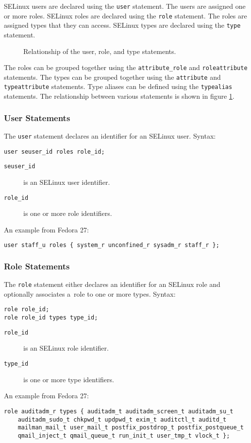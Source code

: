 SELinux users are declared using the \texttt{user} statement. The users are
assigned one or more roles. SELinux roles are declared using the \texttt{role}
statement. The roles are assigned types that they can access. SELinux types are
declared using the \texttt{type} statement.

\begin{figure}
    \centering
    \label{fig:userroletype}
    
    \caption{Relationship of the user, role, and type statements.}
\end{figure}

The roles can be grouped together using the \texttt{attribute\_role} and
\texttt{roleattribute} statements. The types can be grouped together using the
\texttt{attribute} and \texttt{typeattribute} statements. Type aliases can be
defined using the \texttt{typealias} statements. The relationship between
various statements is shown in figure \ref{fig:userroletype}.

\subsubsection{User Statements}
The \texttt{user} statement declares an identifier for an SELinux user. Syntax:
\begin{lstlisting}[language=te]
user seuser_id roles role_id;
\end{lstlisting}
\begin{description}
    \item [\texttt{seuser\_id}] is an SELinux user identifier.
    \item [\texttt{role\_id}] is one or more role identifiers.
\end{description}
An example from Fedora 27:
\begin{lstlisting}[language=te]
user staff_u roles { system_r unconfined_r sysadm_r staff_r };
\end{lstlisting}

\subsubsection{Role Statements}
The \texttt{role} statement either declares an identifier for an SELinux role
and optionally associates a~role to one or more types. Syntax:
\begin{lstlisting}[language=te]
role role_id;
role role_id types type_id;
\end{lstlisting}
\begin{description}
    \item [\texttt{role\_id}] is an SELinux role identifier.
    \item [\texttt{type\_id}] is one or more type identifiers.
\end{description}
An example from Fedora 27:
\begin{lstlisting}[language=te]
role auditadm_r types { auditadm_t auditadm_screen_t auditadm_su_t
    auditadm_sudo_t chkpwd_t updpwd_t exim_t auditctl_t auditd_t
    mailman_mail_t user_mail_t postfix_postdrop_t postfix_postqueue_t
    qmail_inject_t qmail_queue_t run_init_t user_tmp_t vlock_t };
\end{lstlisting}

